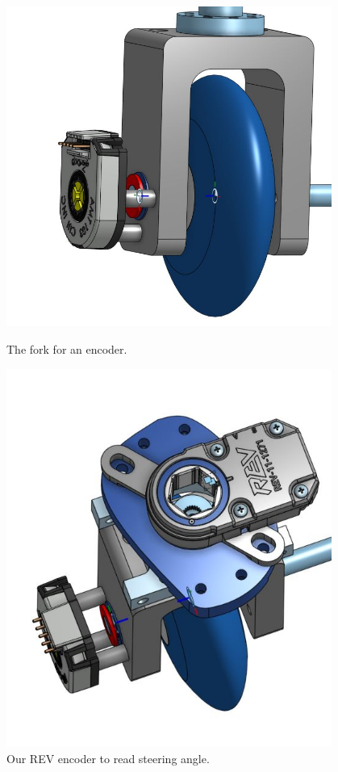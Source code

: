  

\begin{figure}[ht]
\centering
\begin{minipage}[b]{.48\textwidth}
  \centering
  \includegraphics[width=0.95\textwidth]{Meetings/October/10-20-21/10-20-21_CAD_Figure1 - Nathan Forrer.JPG}
  \caption{The fork for an encoder.}
  \label{fig:pic1}
\end{minipage}%
\hfill%
\begin{minipage}[b]{.48\textwidth}
  \centering
  \includegraphics[width=0.95\textwidth]{Meetings/October/10-20-21/10-20-21_CAD_Figure2 - Nathan Forrer.JPG}
  \caption{Our REV encoder to read steering angle.}
  \label{fig:pic2}
\end{minipage}
\end{figure}

